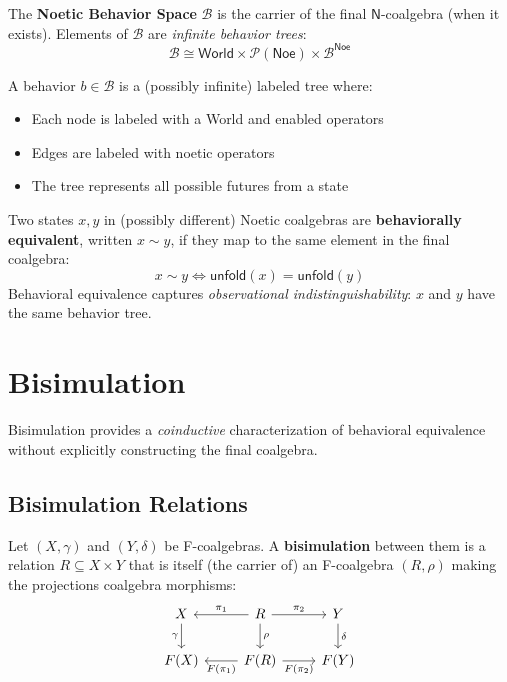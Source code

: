 \begin{definition}
\label{def:noetic-behavior-space}
The \textbf{Noetic Behavior Space} $\mathcal{B}$ is the carrier of the final
$\mathsf{N}$-coalgebra (when it exists). Elements of $\mathcal{B}$ are
\emph{infinite behavior trees}:
\[
  \mathcal{B} \cong \mathsf{World} \times \mathcal{P}(\mathsf{Noe}) \times \mathcal{B}^{\mathsf{Noe}}
\]

A behavior $b \in \mathcal{B}$ is a (possibly infinite) labeled tree where:
\begin{itemize}
  \item Each node is labeled with a World and enabled operators
  \item Edges are labeled with noetic operators
  \item The tree represents all possible futures from a state
\end{itemize}
\end{definition}

\begin{definition}
\label{def:behavioral-equivalence}
Two states $x, y$ in (possibly different) Noetic coalgebras are \textbf{behaviorally
equivalent}, written $x \sim y$, if they map to the same element in the final coalgebra:
\[
  x \sim y \iff \mathsf{unfold}(x) = \mathsf{unfold}(y)
\]
Behavioral equivalence captures \emph{observational indistinguishability}: $x$ and $y$
have the same behavior tree.
\end{definition}

\section{Bisimulation}
\label{sec:bisimulation}

Bisimulation provides a \emph{coinductive} characterization of behavioral equivalence
without explicitly constructing the final coalgebra.

\subsection{Bisimulation Relations}
\label{subsec:bisimulation-relations}

\begin{definition}[Bisimulation]
\label{def:bisimulation}
Let $(X, \gamma)$ and $(Y, \delta)$ be F-coalgebras. A \textbf{bisimulation}
between them is a relation $R \subseteq X \times Y$ that is itself (the carrier of)
an F-coalgebra $(R, \rho)$ making the projections coalgebra morphisms:
\[
\begin{tikzcd}
  X \arrow[d, "\gamma"']
  & R \arrow[l, "\pi_1"'] \arrow[r, "\pi_2"] \arrow[d, "\rho"]
  & Y \arrow[d, "\delta"] \\
  F(X)
  & F(R) \arrow[l, "F(\pi_1)"] \arrow[r, "F(\pi_2)"']
  & F(Y)
\end{tikzcd}
\]
\end{definition}

